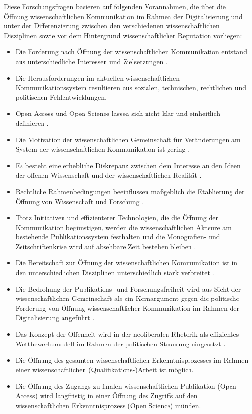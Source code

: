 Diese Forschungsfragen basieren auf folgenden Vorannahmen, die über die Öffnung wissenschaftlichen Kommunikation im Rahmen der Digitalisierung und unter der Differenzierung zwischen den verschiedenen wissenschaftlichen Disziplinen sowie vor dem Hintergrund wissenschaftlicher Reputation vorliegen:
\begin{itemize}
\item Die Forderung nach Öffnung der wissenschaftlichen Kommunikation entstand aus unterschiedliche Interessen und Zielsetzungen \cite{suchen-Hoffmann-Zugang-undVerwertung-oeffentlicher-Informationen}.
\item Die Herausforderungen im aktuellen wissenschaftlichen Kommunikationssystem resultieren aus sozialen, technischen, rechtlichen und politischen Fehlentwicklungen.
\item Open Access und Open Science lassen sich nicht klar und einheitlich definieren \cite{naeder_2010_open}.
\item Die Motivation der wissenschaftlichen Gemeinschaft für Veränderungen am System der wissenschaftlichen Kommunikation ist gering \cite{hagner_2015_sache_buches}.
\item Es besteht eine erhebliche Diskrepanz zwischen dem Interesse an den Ideen der offenen Wissenschaft und der wissenschaftlichen Realität \cite{Scheliga_2014}.
\item Rechtliche Rahmenbedingungen beeinflussen maßgeblich die Etablierung der Öffnung von Wissenschaft und Forschung \cite[:211]{Fehling_2014}.
\item Trotz Initiativen und effizienterer Technologien, die die Öffnung der Kommunikation begünstigen, werden die wissenschaftlichen Akteure am bestehende Publikationssystem festhalten und die Monografien- und Zeitschriftenkrise wird auf absehbare Zeit bestehen bleiben \cite{Parks_2002_acadamic_faust} \cite{Goetting_2015}.
\item Die Bereitschaft zur Öffnung der wissenschaftlichen Kommunikation ist in den unterschiedlichen Disziplinen unterschiedlich stark verbreitet \cite{EuropeanCommission_sciencepub_2006} \cite{pansegrau_2011_wissenschaftskommunikation}.
\item Die Bedrohung der Publikations- und Forschungsfreiheit wird aus Sicht der wissenschaftlichen Gemeinschaft als ein Kernargument gegen die politische Forderung von Öffnung wissenschaftlicher Kommunikation im Rahmen der Digitalisierung angeführt \cite{siehe_unten}.
\item Das Konzept der Offenheit wird in der neoliberalen Rhetorik als effizientes Wettbewerbsmodell im Rahmen der  politischen Steuerung eingesetzt \cite{tkacz_2012_open}.
\item Die Öffnung des gesamten wissenschaftlichen Erkenntnisprozesses im Rahmen einer wissenschaftlichen (Qualifikations-)Arbeit ist möglich.
\item Die Öffnung des Zugangs zu finalen wissenschaftlichen Publikation (Open Access) wird langfristig in einer Öffnung des Zugriffs auf den wissenschaftlichen Erkenntnisprozess (Open Science) münden.
\end{itemize}

